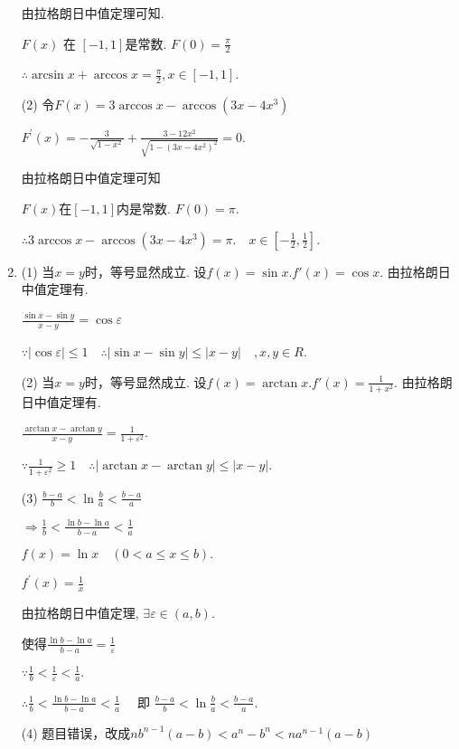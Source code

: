 \documentclass{article}
\begin{document}
\begin{enumerate}[1.]
				由拉格朗日中值定理可知.
				
				$F(x)$ 在 $[-1,1]$是常数. $F(0)= \frac{\pi}{2}$
				
				$\therefore \arcsin x+\arccos x=\frac{\pi}{2}, x \in[-1,1]$.
				
				(2) 令$F(x)=3 \arccos x-\arccos \left(3 x-4 x^{3}\right)$
				
				$F^{\prime}(x)=-\frac{3}{\sqrt{1-x^{2}}}+\frac{3-12 x^{2}}{\sqrt{1-\left(3 x-4 x^{2}\right)^{2}}}=0.$
				
				由拉格朗日中值定理可知
				
				$F(x)$在$[-1,1]$内是常数. $F(0)=\pi$.
				
				$\therefore 3 \arccos x-\arccos \left(3 x-4 x^{3}\right)=\pi. \quad x \in\left[-\frac{1}{2}, \frac{1}{2}\right]$.
				
			\item (1) 当$x=y$时，等号显然成立. 设$f(x)=\sin x. f'(x)=\cos x.$ 由拉格朗日中值定理有.
			
				$\frac{\sin x-\sin y}{x-y}=\cos \varepsilon$  
				
				$\because|\cos \varepsilon| \leq 1 \quad \therefore|\sin x-\sin y| \leq|x-y| \quad, x, y \in R$.
				
				(2) 当$x=y$时，等号显然成立. 设$f(x)=\arctan x. f'(x)=\frac{1}{1+x^2}.$ 由拉格朗日中值定理有.
				
				$\frac{\arctan x-\arctan y}{x-y}=\frac{1}{1+\varepsilon^{2}}$.
				
				$\because \frac{1}{1+\varepsilon^{2}} \geqslant 1 \quad \therefore|\arctan x-\arctan y| \leqslant|x-y|$.
				
				(3) $\frac{b-a}{b}<\ln \frac{b}{a}<\frac{b-a}{a}$
				
				$\Rightarrow \frac{1}{b} <\frac{\ln b-\ln a}{b-a}<\frac{1}{a}$
				
				$f(x)=\ln x \quad(0<a \leq x \leq b) .$
				
				$f^{\prime}(x) =\frac{1}{x}$
				
				由拉格朗日中值定理, $\exists \varepsilon\in(a, b)$.
				
				使得$\frac{\ln b-\ln a}{b-a}=\frac{1}{\varepsilon}$
				
				$\because \frac{1}{b}<\frac{1}{\varepsilon}<\frac{1}{a} .$
				
				$\therefore \frac{1}{b}<\frac{\ln b-\ln a}{b-a}<\frac{1}{a} \quad$ 即 $\frac{b-a}{b}<\ln \frac{b}{a}<\frac{b-a}{a} .$
				
				(4) 题目错误，改成$nb^{n-1}(a-b)<a^n-b^n<na^{n-1}(a-b)$
				

\end{enumerate}
\end{document}
